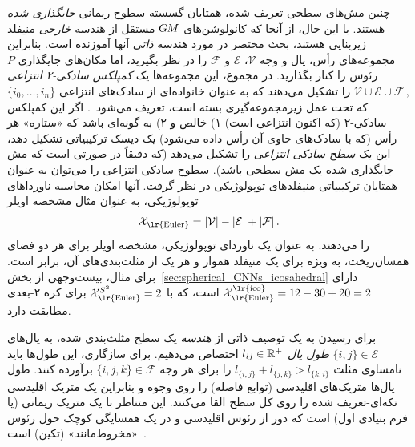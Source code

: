 چنین مش‌های سطحی تعریف شده، همتایان گسسته سطوح ریمانی \emph{جایگذاری شده} هستند.
با این حال، از آنجا که کانولوشن‌های $G\mkern-1.4muM$ مستقل از هندسه \emph{خارجی} منیفلد زیربنایی هستند، بحث مختصر در مورد هندسه \emph{ذاتی} آنها آموزنده است.
بنابراین مجموعه‌های رأس، یال و وجه $\mathcal{V}$، $\mathcal{E}$ و $\mathcal{F}$ را در نظر بگیرید، اما مکان‌های جایگذاری $P$ رئوس را کنار بگذارید.
در مجموع، این مجموعه‌ها یک \emph{کمپلکس سادکی-۲ انتزاعی}
$\mathcal{V} \cup \mathcal{E} \cup \mathcal{F} \,,$
را تشکیل می‌دهند که به عنوان خانواده‌ای از سادک‌های انتزاعی $\{i_0,\dots,i_n\}$ که تحت عمل زیرمجموعه‌گیری بسته است، تعریف می‌شود~\cite{craneDiscreteDifferentialGeometry2014}.
اگر این کمپلکس سادکی-۲ (که اکنون انتزاعی است)
۱) خالص و
۲) به گونه‌ای باشد که «ستاره» هر رأس (که با سادک‌های حاوی آن رأس داده می‌شود) یک دیسک ترکیبیاتی تشکیل دهد،
این یک \emph{سطح سادکی انتزاعی} را تشکیل می‌دهد (که دقیقاً در صورتی است که مش جایگذاری شده یک مش سطحی باشد).
سطوح سادکی انتزاعی را می‌توان به عنوان همتایان ترکیبیاتی منیفلدهای توپولوژیکی در نظر گرفت.
آنها امکان محاسبه ناورداهای توپولوژیکی، به عنوان مثال مشخصه اویلر
\begin{align}
    \mathcal{X}_{\textup{\lr{Euler}}} = |\mathcal{V}|-|\mathcal{E}|+|\mathcal{F}| \,.
\end{align}
را می‌دهند. به عنوان یک ناوردای توپولوژیکی، مشخصه اویلر برای هر دو فضای همسان‌ریخت، به ویژه برای یک منیفلد هموار و هر یک از مثلث‌بندی‌های آن، برابر است.
برای مثال، بیست‌وجهی از بخش~\ref{sec:spherical_CNNs_icosahedral} دارای $\mathcal{X}_{\textup{\lr{Euler}}}^\textup{\lr{ico}} = 12-30+20 = 2$ است، که با $\mathcal{X}_{\textup{\lr{Euler}}}^{S^2} = 2$ برای کره ۲-بعدی مطابقت دارد.


برای رسیدن به یک توصیف ذاتی از \emph{هندسه} یک سطح مثلث‌بندی شده، به یال‌های $\{i,j\} \in \mathcal{E}$ \emph{طول یال} ${l_{ij} \in \mathbb{R}^+}$ اختصاص می‌دهیم.
برای سازگاری، این طول‌ها باید نامساوی مثلث $l_{\{i,j\}} + l_{\{j,k\}} > l_{\{k,i\}}$ را برای هر وجه $\{i,j,k\} \in \mathcal{F}$ برآورده کنند.
طول یال‌ها متریک‌های اقلیدسی (توابع فاصله) را روی وجوه و بنابراین یک متریک اقلیدسی تکه‌ای-تعریف شده را روی کل سطح القا می‌کنند.
این متناظر با یک متریک ریمانی (یا فرم بنیادی اول) است که دور از رئوس اقلیدسی و در یک همسایگی کوچک حول رئوس «مخروط‌مانند» (تکین) است~\cite{Crane2020DiscreteConformalGeometry,desbrun2005DiscreteExteriorCalculus}.


